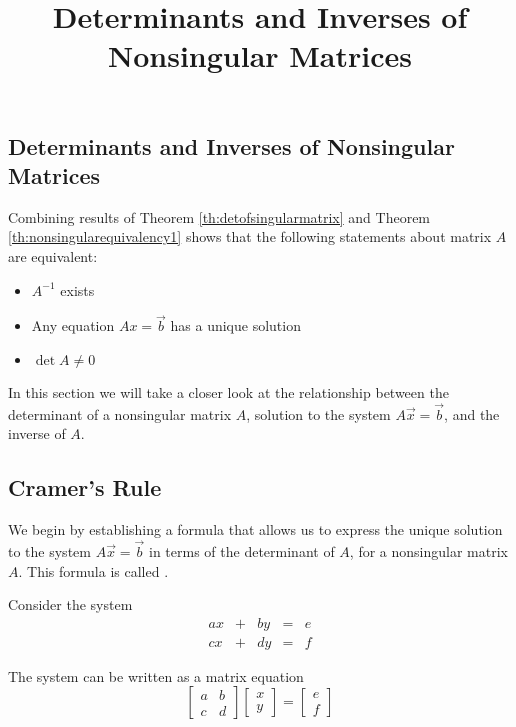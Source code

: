\documentclass{ximera}
\title{Determinants and Inverses of Nonsingular Matrices} \license{CC BY-NC-SA 4.0}
\begin{document}
\begin{abstract}
 \end{abstract}
\maketitle

\begin{onlineOnly}
\section*{Determinants and Inverses of Nonsingular Matrices}
\end{onlineOnly}

Combining results of Theorem \ref{th:detofsingularmatrix} and Theorem \ref{th:nonsingularequivalency1} shows that the following statements about matrix $A$ are equivalent:
\begin{itemize}
\item $A^{-1}$ exists
\item Any equation $Ax=\vec{b}$ has a unique solution
\item $\det{A}\neq 0$
\end{itemize}
In this section we will take a closer look at the relationship between the determinant of a nonsingular matrix $A$, solution to the system $A\vec{x}=\vec{b}$, and the inverse of $A$.  
\subsection*{Cramer's Rule}
We begin by establishing a formula that allows us to express the unique solution to the system $A\vec{x}=\vec{b}$ in terms of the determinant of $A$, for a nonsingular matrix $A$.  This formula is called .

Consider the system
$$\begin{array}{ccccc}
      ax& +&by&=&e\\
      cx & +&dy&= &f 
    \end{array}$$
    
 The system can be written as a matrix equation
 $$\begin{bmatrix}a&b\\c&d\end{bmatrix}\begin{bmatrix}x\\y\end{bmatrix}=\begin{bmatrix}e\\f\end{bmatrix}$$
 
\end{document}
